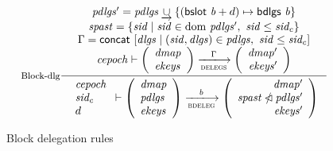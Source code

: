 \begin{figure}
  \begin{equation}
    \label{eq:rule:block-delegation}
    \inference[Block-dlg]
    {
      \var{pdlgs'} = \var{pdlgs} \unionoverride \{(\bslot{b} + d) \mapsto \bdlgs{b} \}\\
      \var{spast} = \{ \var{sid} \mid \var{sid} \in \var \dom ~ \var{pdlgs'}
                                    ,~ \var{sid} \leq \var{sid_c}\}\\
      \Gamma = \fun{concat}~ [ \var{dlgs} \mid (\var{sid}, \var{dlgs}) \in \var{pdlgs}
                                          ,~ \var{sid} \leq \var{sid_c}]\\
      \var{cepoch} \vdash
      {
        \left(
          \begin{array}{l}
            \var{dmap}\\
            \var{ekeys}
          \end{array}
        \right)
      }
      \trans{delegs}{\Gamma}
      {
        \left(
          \begin{array}{r}
            \var{dmap'}\\
            \var{ekeys'}
          \end{array}
        \right)
      }
    }
    {
      \begin{array}{l}
        \var{cepoch}\\
        \var{sid_c}\\
        d
      \end{array}
      \vdash
      {
        \left(
          \begin{array}{l}
            \var{dmap}\\
            \var{pdlgs}\\
            \var{ekeys}
          \end{array}
        \right)
      }
      \trans{bdeleg}{b}
      {
        \left(
          \begin{array}{r}
            \var{dmap'}\\
            \var{\var{spast} \subtractdom pdlgs'}\\
            \var{ekeys'}
          \end{array}
        \right)
      }
    }
  \end{equation}
  \caption{Block delegation rules}
  \label{fig:block-delegation-rules}
\end{figure}

